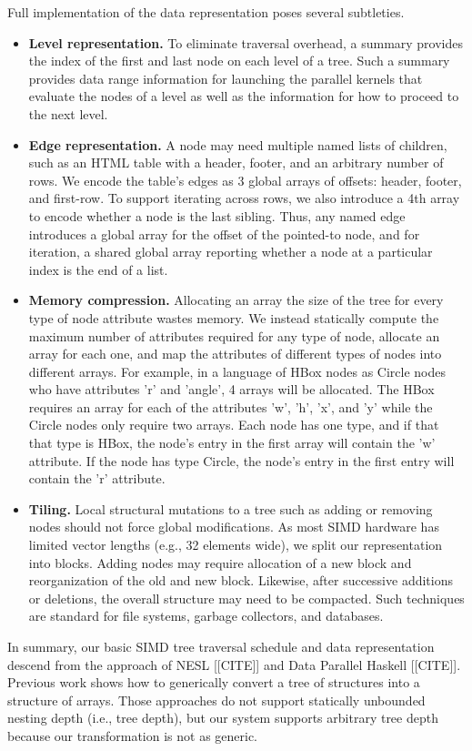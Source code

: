 Full implementation of the data representation poses several subtleties. 
\begin{itemize}
\item \textbf{Level representation.} To eliminate traversal overhead, a summary provides the index of the first and last node on each level of a tree. Such a summary provides  data range information for launching the parallel kernels that evaluate the nodes of a level as well as the information for how to proceed to the next level.
\item \textbf{Edge representation.} A node may need multiple named lists of children, such as an HTML table with a header, footer, and an arbitrary number of rows. We encode the table's edges as 3 global arrays of offsets: header, footer, and first-row. To support iterating across rows, we also introduce a 4th array to encode whether a node is the last sibling. Thus, any named edge introduces a global array for the offset of the pointed-to node, and for iteration, a shared global array reporting whether a node at a particular index is the end of a list.
\item \textbf{Memory compression.} Allocating an array the size of the tree for every type of node attribute wastes memory. We instead statically compute the maximum number of attributes required for any type of node, allocate an array for each one, and map the attributes of different types of nodes into different arrays. For example, in a language of HBox nodes as Circle nodes who have attributes 'r' and 'angle', 4 arrays will be allocated. The HBox requires an array for each of the attributes 'w', 'h', 'x', and 'y' while the Circle nodes only require two arrays. Each node has one type, and if that that type is HBox, the node's entry in the first array will contain the 'w' attribute. If the node has type Circle, the node's entry in the first entry will contain the 'r' attribute.
\item \textbf{Tiling.} Local structural mutations to a tree such as adding or removing nodes should not force global modifications. As most SIMD hardware has limited vector lengths (e.g., 32 elements wide), we split our representation into blocks. Adding nodes may require allocation of a new block and reorganization of the old and new block. Likewise, after successive additions or deletions, the overall structure may need to be compacted. Such techniques are standard for file systems, garbage collectors, and databases.
\end{itemize}


In summary, our basic SIMD tree traversal schedule and data representation descend from the approach of NESL [[CITE]] and Data Parallel Haskell [[CITE]]. Previous work shows how to generically convert a tree of structures into a structure of arrays. Those approaches do not support statically unbounded nesting depth (i.e., tree depth), but our system supports arbitrary tree depth because our transformation is not as generic.  

